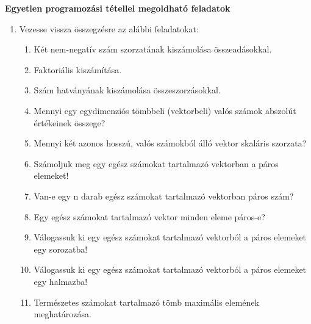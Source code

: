 \documentclass[12pt,twoside,a4paper]{article}	%
\begin{document}

\textbf{Egyetlen programozási tétellel megoldható feladatok}
\begin{enumerate}
\item{Vezesse vissza összegzésre az alábbi feladatokat:}
	\begin{enumerate}
	\item{Két nem-negatív szám szorzatának kiszámolása összeadásokkal.}
	\item{Faktoriális kiszámítása.}
	\item{Szám hatványának kiszámolása összeszorzásokkal.}
	\item{Mennyi egy egydimenziós tömbbeli (vektorbeli) valós számok abszolút értékeinek összege?}
	\item{Mennyi két azonos hosszú, valós számokból álló vektor skaláris szorzata?}
	\item{Számoljuk meg egy egész számokat tartalmazó vektorban a páros elemeket!}
	\item{Van-e egy n darab egész számokat tartalmazó vektorban páros szám?}
	\item{Egy egész számokat tartalmazó vektor minden eleme páros-e?}
	\item{Válogassuk ki egy egész számokat tartalmazó vektorból a páros elemeket egy sorozatba!}
	\item{Válogassuk ki egy egész számokat tartalmazó vektorból a páros elemeket egy halmazba!}
	\item{Természetes számokat tartalmazó tömb maximális elemének meghatározása.}
	\end{enumerate}
\end{enumerate}
\end{document}
